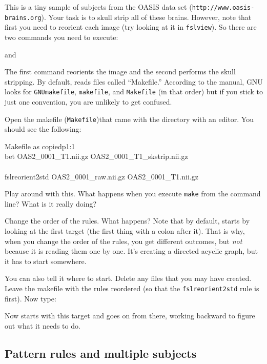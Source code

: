This is a tiny sample of subjects from the OASIS data set (\texttt{http://www.oasis-brains.org}). Your task is to skull strip all of these brains. However, note that first you need to reorient each image (try looking at it in \texttt{fslview}). So there are two commands you need to execute:

and

The first command reorients the image and the second performs the skull stripping. By default, \maken{} reads files called ``Makefile.'' According to the manual, GNU looks for \texttt{GNUmakefile}, \texttt{makefile}, and \texttt{Makefile}  (in that order) but if you stick to just one convention, you are unlikely to get confused. 

Open the makefile (\texttt{Makefile})that came with the directory with an editor. You should see the following:

\begin{make}{Makefile as copied}{p1:1}
	 \\
	\tab bet OAS2_0001_T1.nii.gz OAS2_0001_T1_skstrip.nii.gz \\
	
	\\
	\tab fslreorient2std OAS2_0001_raw.nii.gz OAS2_0001_T1.nii.gz
\end{make}

Play around with this. What happens when you execute \texttt{make} from the command line? What is it really doing?

Change the order of the rules. What happens? Note that by default, \maken{} starts by looking at the first target (the first thing with a colon after it). That is why, when you change the order of the rules, you get different outcomes, but \emph{not} because it is reading them one by one. It's creating a directed acyclic graph, but it has to start somewhere.

You can also tell it where to start. Delete any files that you may have created. Leave the makefile with the rules reordered (so that the \texttt{fslreorient2std} rule is first). Now type:

Now \maken{} starts with this target and goes on from there, working backward to figure out what it needs to do.

\subsection{Pattern rules and multiple subjects}

